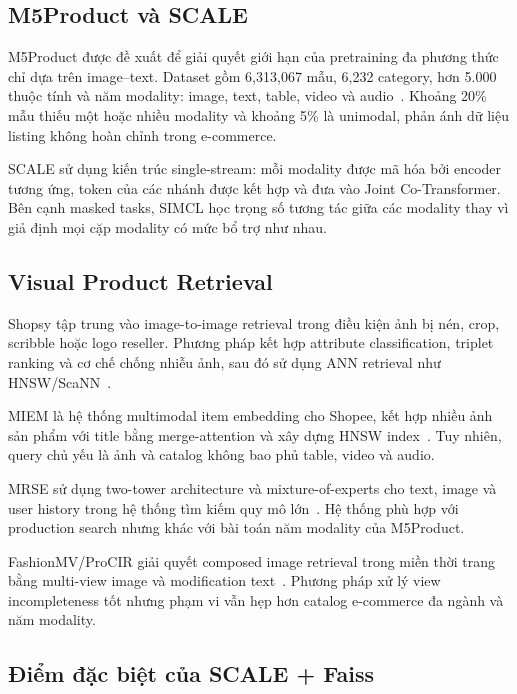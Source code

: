 \documentclass[10pt,conference]{IEEEtran}
\begin{document}
\subsection{M5Product và SCALE}

M5Product được đề xuất để giải quyết giới hạn của pretraining đa phương thức chỉ dựa trên image--text. Dataset gồm 6,313,067 mẫu, 6,232 category, hơn 5.000 thuộc tính và năm modality: image, text, table, video và audio~\cite{dong2022m5product}. Khoảng 20\% mẫu thiếu một hoặc nhiều modality và khoảng 5\% là unimodal, phản ánh dữ liệu listing không hoàn chỉnh trong e-commerce.

SCALE sử dụng kiến trúc single-stream: mỗi modality được mã hóa bởi encoder tương ứng, token của các nhánh được kết hợp và đưa vào Joint Co-Transformer. Bên cạnh masked tasks, SIMCL học trọng số tương tác giữa các modality thay vì giả định mọi cặp modality có mức bổ trợ như nhau.

\subsection{Visual Product Retrieval}

Shopsy tập trung vào image-to-image retrieval trong điều kiện ảnh bị nén, crop, scribble hoặc logo reseller. Phương pháp kết hợp attribute classification, triplet ranking và cơ chế chống nhiễu ảnh, sau đó sử dụng ANN retrieval như HNSW/ScaNN~\cite{nadkarni2022shopsy}.

MIEM là hệ thống multimodal item embedding cho Shopee, kết hợp nhiều ảnh sản phẩm với title bằng merge-attention và xây dựng HNSW index~\cite{liu2024miem}. Tuy nhiên, query chủ yếu là ảnh và catalog không bao phủ table, video và audio.

MRSE sử dụng two-tower architecture và mixture-of-experts cho text, image và user history trong hệ thống tìm kiếm quy mô lớn~\cite{jiang2024mrse}. Hệ thống phù hợp với production search nhưng khác với bài toán năm modality của M5Product.

FashionMV/ProCIR giải quyết composed image retrieval trong miền thời trang bằng multi-view image và modification text~\cite{yuan2026fashionmv}. Phương pháp xử lý view incompleteness tốt nhưng phạm vi vẫn hẹp hơn catalog e-commerce đa ngành và năm modality.

\subsection{Điểm đặc biệt của SCALE + Faiss}
\end{document}
